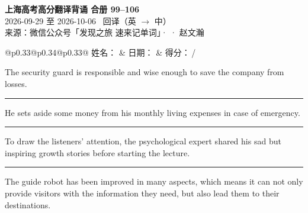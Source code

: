 \documentclass[11pt,a4paper]{article}
\newcommand{\num}[1]{\makebox[1.9em][r]{#1.}\hspace{0.3em}}
\newcommand{\wline}{\noindent\rule{\linewidth}{0.4pt}}
\begin{document}
\pagestyle{plain}
\begin{center}
{\LARGE\bfseries 上海高考高分翻译背诵 \quad 合册 99–106}\\[0.25em]
{\large 2026-09-29 至 2026-10-06 \quad\ 回译（英 $\to$ 中）}\\[0.35em]
{\footnotesize 来源：微信公众号「发现之旅 速来记单词」·  · 赵文瀚}
\end{center}

\vspace{0.4em}
\noindent\begin{tabular}{@{}p{0.33\textwidth}@{}p{0.34\textwidth}@{}p{0.33\textwidth}@{}}
姓名：\underline{\hspace{2.0cm}} & 日期：\underline{\hspace{2.0cm}} & 得分：\underline{\hspace{1.4cm}}\,/ \\
\end{tabular}

\vspace{0.5em}

\vspace{0.8em}
\vspace{0.35em}\vspace{0.15em}

\num{1}The security guard is responsible and wise enough to save the company from losses.

\vspace{0.25em}

\wline

\num{2}He sets  aside some money from his monthly living expenses in case of emergency.

\vspace{0.25em}

\wline

\num{3}To draw the listeners’ attention, the psychological expert shared his sad but inspiring growth stories before starting the lecture.

\vspace{0.25em}

\wline

\num{4}The guide robot has been improved in many aspects, which means it can not only provide visitors with the information they need, but also lead them to their destinations.

\vspace{0.25em}
\end{document}
